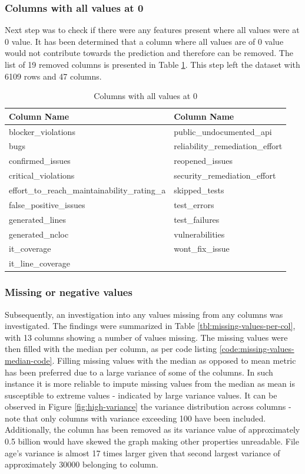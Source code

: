 \subsubsection{Columns with all values at 0}\label{sec:impl-data-analysis:all-cols-at-0}
Next step was to check if there were any features present where all values were at 0 value. It has been determined that a column where all values are of 0 value would not contribute towards the prediction and therefore can be removed. The list of 19 removed columns is presented in Table \ref{tbl:zero-value-columns}. This step left the dataset with 6109 rows and 47 columns.

\begin{table}[!h]
\centering
\caption{Columns with all values at 0}
\label{tbl:zero-value-columns}
\begin{tabular}{@{}ll@{}}
\toprule
Column Name & Column Name \\ \midrule
blocker\_violations & public\_undocumented\_api \\
bugs & reliability\_remediation\_effort \\
confirmed\_issues & reopened\_issues \\
critical\_violations & security\_remediation\_effort \\
effort\_to\_reach\_maintainability\_rating\_a & skipped\_tests \\
false\_positive\_issues & test\_errors \\
generated\_lines & test\_failures \\
generated\_ncloc & vulnerabilities \\
it\_coverage & wont\_fix\_issue \\
it\_line\_coverage &  \\ \bottomrule
\end{tabular}
\end{table}



\subsubsection{Missing or negative values}\label{sec:impl-data-analysis:missing-or-negative-values}
Subsequently, an investigation into any values missing from any columns was investigated. The findings were summarized in Table \ref{tbl:missing-values-per-col}, with 13 columns showing a number of values missing. The missing values were then filled with the median per column, as per code listing \ref{code:missing-values-median-code}. Filling missing values with the median as opposed to mean metric has been preferred due to a large variance of some of the columns. In such instance it is more reliable to impute missing values from the median as mean is susceptible to extreme values - indicated by large variance values. It can be observed in Figure \ref{fig:high-variance} the variance distribution across columns - note that only columns with variance exceeding 100 have been included. Additionally, the \fileAgeInSec{} column has been removed as its variance value of approximately 0.5 billion would have skewed the graph making other properties unreadable. File age's variance is almost 17 times larger given that second largest variance of approximately 30000 belonging to \lines{} column.

